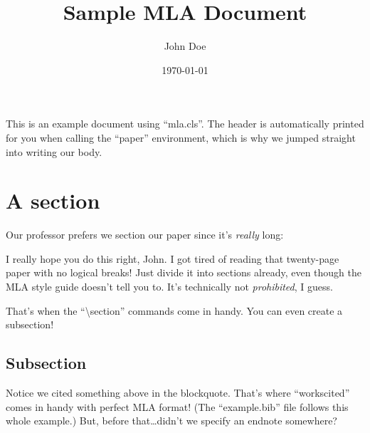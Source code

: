 \documentclass[mla7]{mla}
\title{Sample MLA Document}
\author{John Doe}
\date{\today}
\begin{document}
\begin{paper}

This is an example document using ``mla.cls''.
The header is automatically printed for you when calling the
``paper'' environment, which is why we jumped straight into
writing our body.

\section{A section}

Our professor prefers we section our paper since it's
\emph{really} long:
\begin{blockquote}
I really hope you do this right, John.
I got tired of reading that twenty-page paper with no logical breaks!
Just divide it into sections already, even though the MLA style guide
doesn't tell you to.
It's technically not \emph{prohibited}, I guess.  \cite{que2019}
\end{blockquote}
That's when the ``\textbackslash{}section'' commands come in handy.
You can even create a subsection!

\subsection{Subsection}

Notice we cited something above in the blockquote.
That's where ``workscited'' comes in handy with perfect MLA format!
(The ``example.bib'' file follows this whole example.)
But, before that\ldots didn't we specify an endnote somewhere?

\end{paper}

\begin{notes}


\printendnotes[mla]

\end{notes}

\begin{workscited}



\printbibliography[heading=none]

\end{workscited}
\end{document}
